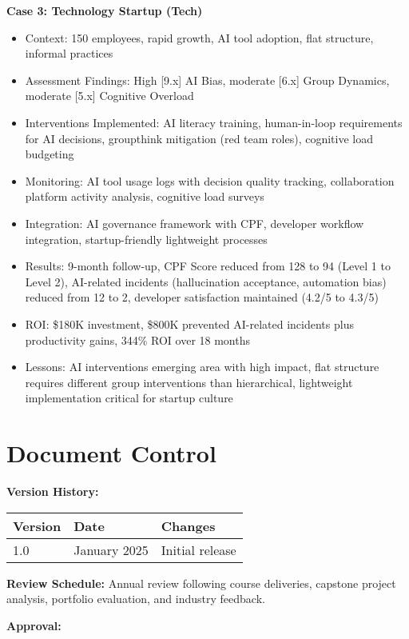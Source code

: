 \documentclass[11pt,a4paper]{article}
\begin{document}
\textbf{Case 3: Technology Startup (Tech)}
\begin{itemize}
\item Context: 150 employees, rapid growth, AI tool adoption, flat structure, informal practices
\item Assessment Findings: High [9.x] AI Bias, moderate [6.x] Group Dynamics, moderate [5.x] Cognitive Overload
\item Interventions Implemented: AI literacy training, human-in-loop requirements for AI decisions, groupthink mitigation (red team roles), cognitive load budgeting
\item Monitoring: AI tool usage logs with decision quality tracking, collaboration platform activity analysis, cognitive load surveys
\item Integration: AI governance framework with CPF, developer workflow integration, startup-friendly lightweight processes
\item Results: 9-month follow-up, CPF Score reduced from 128 to 94 (Level 1 to Level 2), AI-related incidents (hallucination acceptance, automation bias) reduced from 12 to 2, developer satisfaction maintained (4.2/5 to 4.3/5)
\item ROI: \$180K investment, \$800K prevented AI-related incidents plus productivity gains, 344\% ROI over 18 months
\item Lessons: AI interventions emerging area with high impact, flat structure requires different group interventions than hierarchical, lightweight implementation critical for startup culture
\end{itemize}

\section*{Document Control}

\textbf{Version History:}

\begin{tabular}{llp{8cm}}
\toprule
Version & Date & Changes \\
\midrule
1.0 & January 2025 & Initial release \\
\bottomrule
\end{tabular}

\vspace{1em}

\textbf{Review Schedule:} Annual review following course deliveries, capstone project analysis, portfolio evaluation, and industry feedback.

\textbf{Approval:}
\end{document}
